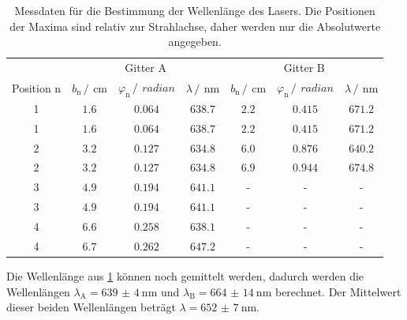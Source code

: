\FloatBarrier
\begin{table}
  \centering
  \caption{Messdaten für die Bestimmung der Wellenlänge des Lasers. Die Positionen der Maxima sind relativ zur Strahlachse, daher werden nur die Absolutwerte angegeben.}
  \label{tab:Maxposi}
  \begin{tabular}{c c c c| c c c}
    \toprule
    &\multicolumn{3}{c}{Gitter A}&\multicolumn{3}{c}{Gitter B}\\
    \cmidrule(lr){2-4} \cmidrule(lr){5-7}
    Position n&$b_{\text{n}}\,/\,\SI{}{\centi\meter}$&$\varphi_{\text{n}}\,/\,\SI{}{radian}$&$\lambda\,/\,\SI{}{\nano\meter}$&$b_{\text{n}}\,/\,\SI{}{\centi\meter}$&$\varphi_{\text{n}}\,/\,\SI{}{radian}$&$\lambda\,/\,\SI{}{\nano\meter}$\\
    \midrule
    1&$\num{1.6}$&$\num{0.064}$&$\num{638.7}$&$\num{2.2}$&$\num{0.415}$&$\num{671.2}$\\
    1&$\num{1.6}$&$\num{0.064}$&$\num{638.7}$&$\num{2.2}$&$\num{0.415}$&$\num{671.2}$\\
    2&$\num{3.2}$&$\num{0.127}$&$\num{634.8}$&$\num{6.0}$&$\num{0.876}$&$\num{640.2}$\\
    2&$\num{3.2}$&$\num{0.127}$&$\num{634.8}$&$\num{6.9}$&$\num{0.944}$&$\num{674.8}$\\
    3&$\num{4.9}$&$\num{0.194}$&$\num{641.1}$&-&-&-\\
    3&$\num{4.9}$&$\num{0.194}$&$\num{641.1}$&-&-&-\\
    4&$\num{6.6}$&$\num{0.258}$&$\num{638.1}$&-&-&-\\
    4&$\num{6.7}$&$\num{0.262}$&$\num{647.2}$&-&-&-\\
    \bottomrule
  \end{tabular}
\end{table}
\FloatBarrier 

Die Wellenlänge aus \ref{tab:Maxposi} können noch gemittelt werden, dadurch werden die Wellenlängen $\lambda_{\text{A}}=\SI{639(4)}{\nano\meter}$ und
$\lambda_{\text{B}}=\SI{664(14)}{\nano\meter}$ berechnet. Der Mittelwert dieser beiden Wellenlängen beträgt $\lambda=\SI{652(7)}{\nano\meter}$.
\newpage